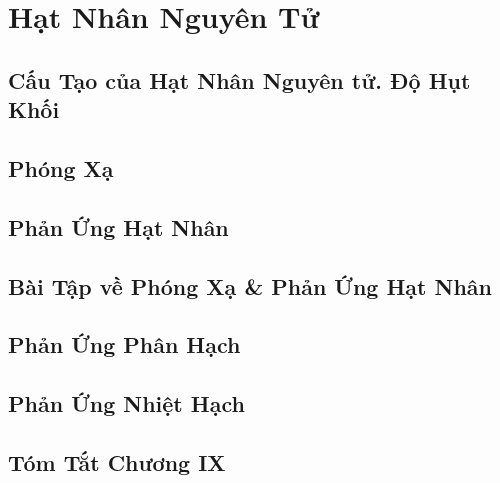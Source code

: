 \documentclass{article}
\numberwithin{equation}{section}
\begin{document}

\section{Hạt Nhân Nguyên Tử}

\subsection{Cấu Tạo của Hạt Nhân Nguyên tử. Độ Hụt Khối}


\subsection{Phóng Xạ}


\subsection{Phản Ứng Hạt Nhân}


\subsection{Bài Tập về Phóng Xạ \& Phản Ứng Hạt Nhân}


\subsection{Phản Ứng Phân Hạch}


\subsection{Phản Ứng Nhiệt Hạch}


\subsection{Tóm Tắt Chương IX}
\end{document}
